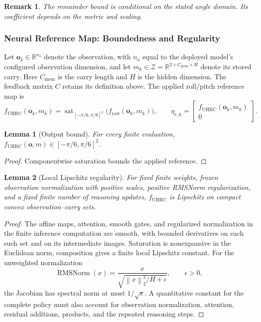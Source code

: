 \documentclass[12pt, a4paper]{article}
\newtheorem{lemma}{Lemma}
\newtheorem{remark}{Remark}
\begin{document}
\begin{remark}
The remainder bound is conditional on the stated angle domain. Its
coefficient depends on the metric and scaling.
\end{remark}

\subsubsection{Neural Reference Map: Boundedness and Regularity}
\label{sec:outer_loop}

Let $\mathbf o_k\in\mathbb R^{n_o}$ denote the observation, with $n_o$
equal to the deployed model's configured observation dimension, and let
$m_k\in\mathcal Z=\mathbb R^{2\times C_{\mathrm{mem}}\times H}$ denote its stored carry.
Here $C_{\mathrm{mem}}$ is the carry length and $H$ is the hidden dimension. The feedback matrix $C$ retains its definition above.
The applied roll/pitch reference map is
\begin{equation}
 f_{\mathrm{UHRC}}(\mathbf o_k,m_k)
 =\operatorname{sat}_{[-\pi/6,\pi/6]^2}
       \bigl(f_{\mathrm{raw}}(\mathbf o_k,m_k)\bigr),
 \qquad
 \eta_{r,k}=
 \begin{bmatrix}f_{\mathrm{UHRC}}(\mathbf o_k,m_k)\\0\end{bmatrix}.
 \label{uhrc:eq:neural-map}
\end{equation}

\begin{lemma}[Output bound]
\label{lem:bounded}
For every finite evaluation,
$f_{\mathrm{UHRC}}(\mathbf o,m)\in[-\pi/6,\pi/6]^2$.
\end{lemma}
\begin{proof}
Componentwise saturation bounds the applied reference.
\end{proof}

\begin{lemma}[Local Lipschitz regularity]
\label{lem:lipschitz}
For fixed finite weights, frozen observation normalization with positive
scales, positive RMSNorm regularization, and a fixed finite number of
reasoning updates, $f_{\mathrm{UHRC}}$ is Lipschitz on compact convex
observation--carry sets.
\end{lemma}
\begin{proof}
The affine maps, attention, smooth gates, and regularized normalization
in the finite inference computation are smooth, with bounded derivatives
on each such set and on its intermediate images. Saturation is
nonexpansive in the Euclidean norm, composition gives a finite local
Lipschitz constant. For the unweighted normalization
\[
 \operatorname{RMSNorm}(x)
 =\frac{x}{\sqrt{\left\lVert x\right\rVert_{2}^2/H+\epsilon}},\qquad \epsilon>0,
\]
the Jacobian has spectral norm at most $1/\sqrt\epsilon$.
A quantitative constant for the complete policy must also account for
observation normalization, attention, residual additions, products, and
the repeated reasoning steps.
\end{proof}
\end{document}
